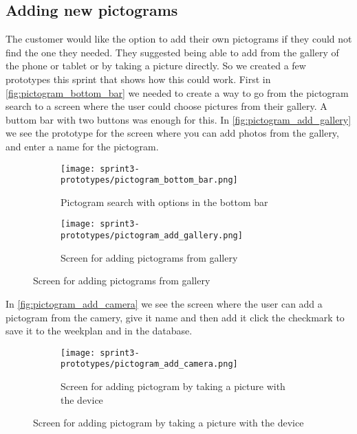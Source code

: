 \subsection{Adding new pictograms}
The customer would like the option to add their own pictograms if they could not find the one they needed. They suggested being able to add from the gallery of the phone or tablet or by taking a picture directly. So we created a few prototypes this sprint that shows how this could work. First in \autoref{fig:pictogram_bottom_bar} we needed to create a way to go from the pictogram search to a screen where the user could choose pictures from their gallery. A buttom bar with two buttons was enough for this. In \autoref{fig:pictogram_add_gallery} we see the prototype for the screen where you can add photos from the gallery, and enter a name for the pictogram.
\begin{figure}[H]
    \begin{subfigure}{0.5\textwidth}
    \texttt{[image: sprint3-prototypes/pictogram\_bottom\_bar.png]} 
    \caption{Pictogram search with options in the bottom bar}
    \label{fig:pictogram_bottom_bar}
    \end{subfigure}
    \begin{subfigure}{0.5\textwidth}
        \texttt{[image: sprint3-prototypes/pictogram\_add\_gallery.png]}
    \caption{Screen for adding pictograms from gallery}
    \label{fig:pictogram_add_gallery}
    \end{subfigure} 
\end{figure}
In \autoref{fig:pictogram_add_camera} we see the screen where the user can add a pictogram from the camery, give it name and then add it click the checkmark to save it to the weekplan and in the database.
\begin{figure}[H]
    \begin{subfigure}{0.5\textwidth}
    \texttt{[image: sprint3-prototypes/pictogram\_add\_camera.png]} 
    \caption{Screen for adding pictogram by taking a picture with the device}
    \label{fig:pictogram_add_camera}
    \end{subfigure}
\end{figure}